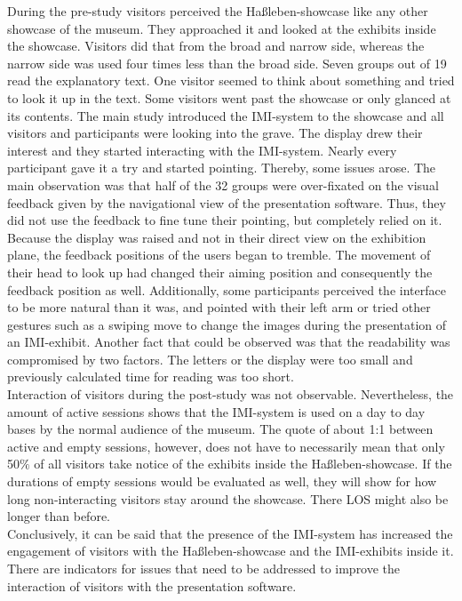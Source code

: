 During the pre-study visitors perceived the Haßleben-showcase like any other showcase of the museum. They approached it and looked at the exhibits inside the showcase. Visitors did that from the broad and narrow side, whereas the narrow side was used four times less than the broad side. Seven groups out of 19 read the explanatory text. One visitor seemed to think about something and tried to look it up in the text. Some visitors went past the showcase or only glanced at its contents. The main study introduced the \ac{IMI}-system to the showcase and all visitors and participants were looking into the grave. The display drew their interest and they started interacting with the \ac{IMI}-system. Nearly every participant gave it a try and started pointing. Thereby, some issues arose. The main observation was that half of the 32 groups were over-fixated on the visual feedback given by the navigational view of the presentation software. Thus, they did not use the feedback to fine tune their pointing, but completely relied on it. Because the display was raised and not in their direct view on the exhibition plane, the feedback positions of the users began to tremble. The movement of their head to look up had changed their aiming position and consequently the feedback position as well. Additionally, some participants perceived the interface to be more natural than it was, and pointed with their left arm or tried other gestures such as a swiping move to change the images during the presentation of an \ac{IMI}-exhibit. Another fact that could be observed was that the readability was compromised by two factors. The letters or the display were too small and previously calculated time for reading was too short.
\\
Interaction of visitors during the post-study was not observable. Nevertheless, the amount of active sessions shows that the \ac{IMI}-system is used on a day to day bases by the normal audience of the museum. The quote of about 1:1 between active and empty sessions, however, does not have to necessarily mean that only 50$\%$ of all visitors take notice of the exhibits inside the Haßleben-showcase. If the durations of empty sessions would be evaluated as well, they will show for how long non-interacting visitors stay around the showcase. There \ac{LOS} might also be longer than before.
\\
Conclusively, it can be said that the presence of the \ac{IMI}-system has increased the engagement of visitors with the Haßleben-showcase and the \ac{IMI}-exhibits inside it. There are indicators for issues that need to be addressed to improve the interaction of visitors with the presentation software. 

